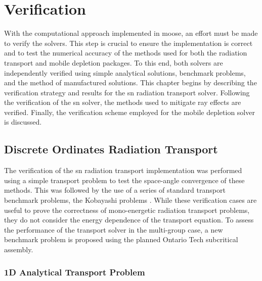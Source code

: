 \chapter{Verification}
\label{verification}

With the computational approach implemented in \acrshort{moose}, an effort must be made to verify the solvers. This step is crucial to ensure the implementation is correct and to test the numerical accuracy of the methods used for both the radiation transport and mobile depletion packages. To this end, both solvers are independently verified using simple analytical solutions, benchmark problems, and the method of manufactured solutions. This chapter begins by describing the verification strategy and results for the \acrshort{sn} radiation transport solver. Following the verification of the \acrshort{sn} solver, the methods used to mitigate ray effects are verified. Finally, the verification scheme employed for the mobile depletion solver is discussed.

\section{Discrete Ordinates Radiation Transport}
\label{verification:radiation_transport_sn}

The verification of the \acrshort{sn} radiation transport implementation was performed using a simple transport problem to test the space-angle convergence of these methods. This was followed by the use of a series of standard transport benchmark problems, the Kobayashi problems \cite{kobayashi_benchmarks}. While these verification cases are useful to prove the correctness of mono-energetic radiation transport problems, they do not consider the energy dependence of the transport equation. To assess the performance of the transport solver in the multi-group case, a new benchmark problem is proposed using the planned Ontario Tech subcritical assembly.

\subsection{1D Analytical Transport Problem}
\label{verification:radiation_transport_sn:1D_anal}

